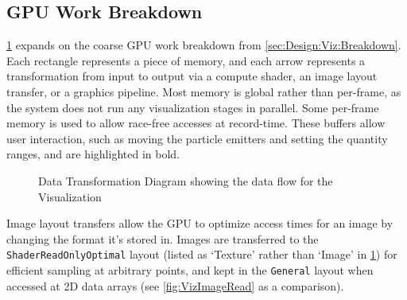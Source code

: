 \subsection{GPU Work Breakdown}
\cref{fig:VizDataTransform} expands on the coarse GPU work breakdown from \cref{sec:Design:Viz:Breakdown}.
Each rectangle represents a piece of memory, and each arrow represents a transformation from input to output via a compute shader, an image layout transfer, or a graphics pipeline.
Most memory is global rather than per-frame, as the system does not run any visualization stages in parallel.
Some per-frame memory is used to allow race-free accesses at record-time.
These buffers allow user interaction, such as moving the particle emitters and setting the quantity ranges, and are highlighted in bold.
\pagebreak
{}
\begin{figure}
    \centering
    \caption{Data Transformation Diagram showing the data flow for the Visualization}
    \label{fig:VizDataTransform}
\end{figure}
\restoregeometry
\pagebreak

Image layout transfers allow the GPU to optimize access times for an image by changing the format it's stored in.
Images are transferred to the \texttt{ShaderReadOnlyOptimal} layout (listed as `Texture' rather than `Image' in \cref{fig:VizDataTransform}) for efficient sampling at arbitrary points, and kept in the \texttt{General} layout when accessed at 2D data arrays (see \cref{fig:VizImageRead} as a comparison).

